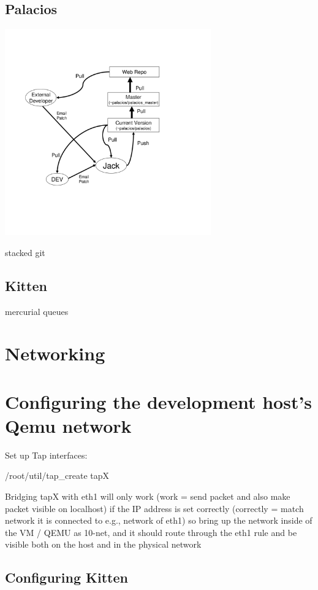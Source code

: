 \documentclass[11pt]{article}
\begin{document}
\subsection{Palacios}

\includegraphics[height=3.5in]{dev_chart.pdf}

stacked git

\subsection{Kitten}

mercurial queues

\section{Networking}

\section{Configuring the development host's Qemu network}
Set up Tap interfaces:

/root/util/tap\_create tapX

Bridging tapX with eth1 will only work (work = send packet and also make packet visible on localhost) if the IP address is set correctly (correctly = match network it is connected to  e.g., network of eth1)  so bring up the network inside of the VM / QEMU as 10-net, and it should route through the eth1 rule and be visible both on the host and in the physical network


\subsection{Configuring Kitten}
\end{document}
